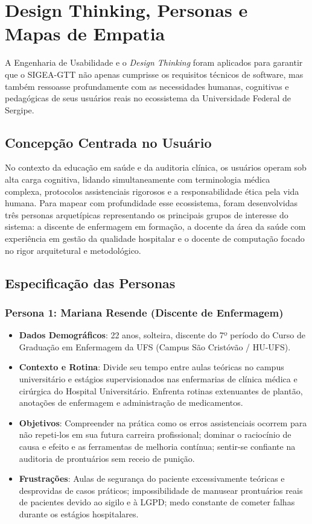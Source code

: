 \chapter{Design Thinking, Personas e Mapas de Empatia}
\label{cap_design_ux}

A Engenharia de Usabilidade e o \textit{Design Thinking} foram aplicados para garantir que o SIGEA-GTT não apenas cumprisse os requisitos técnicos de software, mas também ressoasse profundamente com as necessidades humanas, cognitivas e pedagógicas de seus usuários reais no ecossistema da Universidade Federal de Sergipe.

\section{Concepção Centrada no Usuário}
\label{sec_design_thinking}

No contexto da educação em saúde e da auditoria clínica, os usuários operam sob alta carga cognitiva, lidando simultaneamente com terminologia médica complexa, protocolos assistenciais rigorosos e a responsabilidade ética pela vida humana. Para mapear com profundidade esse ecossistema, foram desenvolvidas três personas arquetípicas representando os principais grupos de interesse do sistema: a discente de enfermagem em formação, a docente da área da saúde com experiência em gestão da qualidade hospitalar e o docente de computação focado no rigor arquitetural e metodológico.

\section{Especificação das Personas}
\label{sec_personas}

\subsection{Persona 1: Mariana Resende (Discente de Enfermagem)}
\begin{itemize}
    \item \textbf{Dados Demográficos}: 22 anos, solteira, discente do 7º período do Curso de Graduação em Enfermagem da UFS (Campus São Cristóvão / HU-UFS).
    \item \textbf{Contexto e Rotina}: Divide seu tempo entre aulas teóricas no campus universitário e estágios supervisionados nas enfermarias de clínica médica e cirúrgica do Hospital Universitário. Enfrenta rotinas extenuantes de plantão, anotações de enfermagem e administração de medicamentos.
    \item \textbf{Objetivos}: Compreender na prática como os erros assistenciais ocorrem para não repeti-los em sua futura carreira profissional; dominar o raciocínio de causa e efeito e as ferramentas de melhoria contínua; sentir-se confiante na auditoria de prontuários sem receio de punição.
    \item \textbf{Frustrações}: Aulas de segurança do paciente excessivamente teóricas e desprovidas de casos práticos; impossibilidade de manusear prontuários reais de pacientes devido ao sigilo e à LGPD; medo constante de cometer falhas durante os estágios hospitalares.
\end{itemize}


